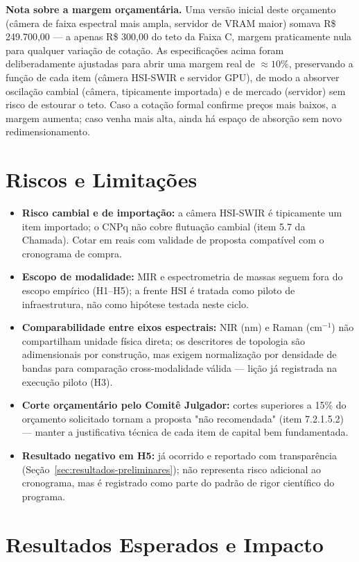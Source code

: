 \documentclass[11pt,a4paper]{article}
\begin{document}
\noindent\textbf{Nota sobre a margem orçamentária.} Uma versão inicial deste orçamento (câmera de faixa espectral mais ampla, servidor de VRAM maior) somava R\$ 249.700,00 --- a apenas R\$ 300,00 do teto da Faixa C, margem praticamente nula para qualquer variação de cotação. As especificações acima foram deliberadamente ajustadas para abrir uma margem real de $\approx 10\%$, preservando a função de cada item (câmera HSI-SWIR e servidor GPU), de modo a absorver oscilação cambial (câmera, tipicamente importada) e de mercado (servidor) sem risco de estourar o teto. Caso a cotação formal confirme preços mais baixos, a margem aumenta; caso venha mais alta, ainda há espaço de absorção sem novo redimensionamento.

\section{Riscos e Limitações}

\begin{itemize}
\item \textbf{Risco cambial e de importação:} a câmera HSI-SWIR é tipicamente um item importado; o CNPq não cobre flutuação cambial (item 5.7 da Chamada). Cotar em reais com validade de proposta compatível com o cronograma de compra.
\item \textbf{Escopo de modalidade:} MIR e espectrometria de massas seguem fora do escopo empírico (H1--H5); a frente HSI é tratada como piloto de infraestrutura, não como hipótese testada neste ciclo.
\item \textbf{Comparabilidade entre eixos espectrais:} NIR (nm) e Raman (cm$^{-1}$) não compartilham unidade física direta; os descritores de topologia são adimensionais por construção, mas exigem normalização por densidade de bandas para comparação cross-modalidade válida --- lição já registrada na execução piloto (H3).
\item \textbf{Corte orçamentário pelo Comitê Julgador:} cortes superiores a 15\% do orçamento solicitado tornam a proposta "não recomendada" (item 7.2.1.5.2) --- manter a justificativa técnica de cada item de capital bem fundamentada.
\item \textbf{Resultado negativo em H5:} já ocorrido e reportado com transparência (Seção~\ref{sec:resultados-preliminares}); não representa risco adicional ao cronograma, mas é registrado como parte do padrão de rigor científico do programa.
\end{itemize}

\section{Resultados Esperados e Impacto}
\end{document}
